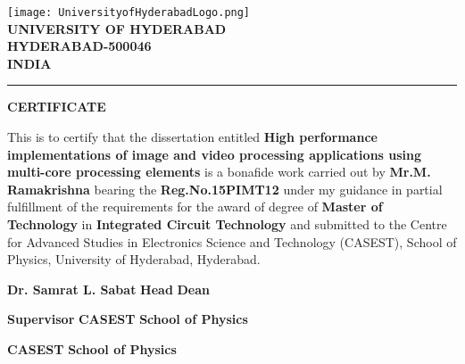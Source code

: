 \newpage
\vspace{-5cm}
{\centering
	\texttt{[image: UniversityofHyderabadLogo.png]}\\
	\textbf{UNIVERSITY OF HYDERABAD}\\
	\textbf{HYDERABAD-500046}\\
	\textbf{INDIA}\\
	\rule{\textwidth}{2pt}
	\begin{center}
		\textbf{CERTIFICATE}
	\end{center}}

This is to certify that the dissertation entitled \textbf{High performance implementations of image and video processing applications using multi-core processing elements} is a bonafide work carried out by \textbf{Mr.M. Ramakrishna} bearing the \textbf{Reg.No.15PIMT12} under my guidance in partial fulfillment of the requirements for the award of degree of \textbf{Master of Technology} in \textbf{Integrated Circuit Technology} and submitted to the Centre for Advanced Studies in Electronics Science and Technology (CASEST), School of Physics, University of Hyderabad, Hyderabad.\par
\vspace{5cm}
\textbf{Dr. Samrat L. Sabat} \hspace{1cm} \textbf{Head} \hspace{3cm} \textbf{Dean}\par
\textbf{Supervisor} \hspace{3.1cm} \textbf{CASEST} \hspace{2.5cm} \textbf{School of Physics}\par
\textbf{CASEST}\hspace{3.5cm} \textbf{School of Physics}\par

